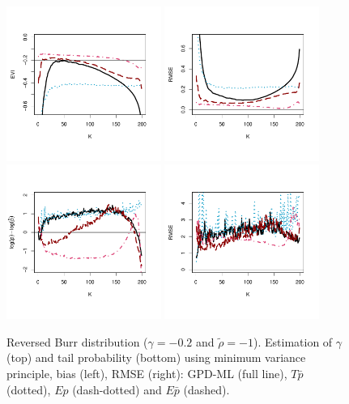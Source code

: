  \begin{figure}[!ht]
 \centering
\includegraphics[width=0.45\textwidth]{./plots/paper3/model3GPD_evi.pdf} 
\includegraphics[width=0.45\textwidth]{./plots/paper3/model3GPD_rmse.pdf} \\
\includegraphics[width=0.45\textwidth]{./plots/paper3/model3GPD_tail.pdf}
\includegraphics[width=0.45\textwidth]{./plots/paper3/model3GPD_tail_rmse.pdf} 
 \caption{ Reversed Burr distribution ($\gamma=-0.2$ and $\tilde\rho=-1$). Estimation of $\gamma$ (top) and tail probability (bottom) using minimum variance principle, bias (left), RMSE (right): GPD-ML (full line), $T\bar{p}$ (dotted), $Ep$ (dash-dotted) and $E\bar{p}$ (dashed).}
\label{paper3:fig8}
\end{figure}

